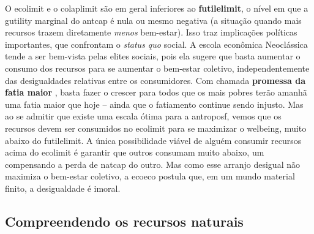 \documentclass[./main.tex]{subfiles}
\begin{document}
\par O \gls{ecolimit} e o \gls{colaplimit} são em geral inferiores ao \textbf{\gls{futilelimit}}, o nível em que a \gls{gutility} marginal do \gls{antcap} é nula ou mesmo negativa (a situação quando mais recursos trazem diretamente \textit{menos} bem-estar). Isso traz implicações políticas importantes, que confrontam o \textit{status quo} social. A escola econômica Neoclássica tende a ser bem-vista pelas elites sociais, pois ela sugere que basta aumentar o consumo dos recursos para se aumentar o bem-estar coletivo, independentemente das desigualdades relativas entre os consumidores. Com chamada \textbf{promessa da fatia maior} , basta fazer o  crescer para todos que os mais pobres terão amanhã uma fatia maior que hoje – ainda que o fatiamento continue sendo injusto. Mas ao se admitir que existe uma escala ótima para a \gls{antroposf}, vemos que os recursos devem ser consumidos no \gls{ecolimit} para se maximizar o \gls{welbeing}, muito abaixo do \gls{futilelimit}. A única possibilidade viável de alguém consumir recursos acima do \gls{ecolimit} é garantir que outros consumam muito abaixo, um compensando a perda de \gls{natcap} do outro. Mas como esse arranjo desigual não maximiza o bem-estar coletivo, a \gls{ecoeco} postula que, em um mundo material finito, a desigualdade é imoral.  

\subsection{Compreendendo os recursos naturais} \label{subsec:natrec}
\end{document}
